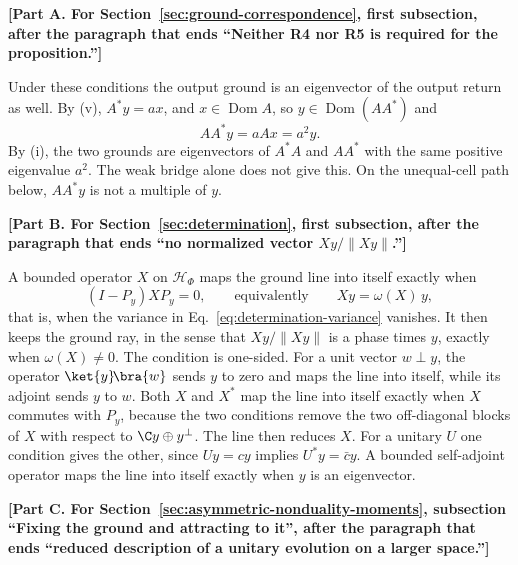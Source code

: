 \par\medskip\noindent\textbf{[Part A. For Section~\ref{sec:ground-correspondence}, first subsection, after the paragraph that ends ``Neither R4 nor R5 is required for the proposition.'']}\par\smallskip

Under these conditions the output ground is an eigenvector of the output return as well. By (v), $A^*y=ax$, and $x\in\operatorname{Dom}A$, so $y\in\operatorname{Dom}(AA^*)$ and
\begin{equation}
 AA^*y=aAx=a^2y .
 \label{eq:ground-output-return}
\end{equation}
By (i), the two grounds are eigenvectors of $A^*A$ and $AA^*$ with the same positive eigenvalue $a^2$. The weak bridge alone does not give this. On the unequal-cell path below, $AA^*y$ is not a multiple of $y$.

\par\medskip\noindent\textbf{[Part B. For Section~\ref{sec:determination}, first subsection, after the paragraph that ends ``no normalized vector $Xy/\|Xy\|$.'']}\par\smallskip

A bounded operator $X$ on $\mathcal H_\Phi$ maps the ground line into itself exactly when
\begin{equation}
 (I-P_y)XP_y=0,\qquad\text{equivalently}\qquad Xy=\omega(X)\,y ,
 \label{eq:ground-line-kept}
\end{equation}
that is, when the variance in Eq.~\eqref{eq:determination-variance} vanishes. It then keeps the ground ray, in the sense that $Xy/\|Xy\|$ is a phase times $y$, exactly when $\omega(X)\ne0$. The condition is one-sided. For a unit vector $w\perp y$, the operator $\ket{y}\!\bra{w}$ sends $y$ to zero and maps the line into itself, while its adjoint sends $y$ to $w$. Both $X$ and $X^*$ map the line into itself exactly when $X$ commutes with $P_y$, because the two conditions remove the two off-diagonal blocks of $X$ with respect to $\C y\oplus y^\perp$. The line then reduces $X$. For a unitary $U$ one condition gives the other, since $Uy=cy$ implies $U^*y=\bar cy$. A bounded self-adjoint operator maps the line into itself exactly when $y$ is an eigenvector.

\par\medskip\noindent\textbf{[Part C. For Section~\ref{sec:asymmetric-nonduality-moments}, subsection ``Fixing the ground and attracting to it'', after the paragraph that ends ``reduced description of a unitary evolution on a larger space.'']}\par\smallskip

